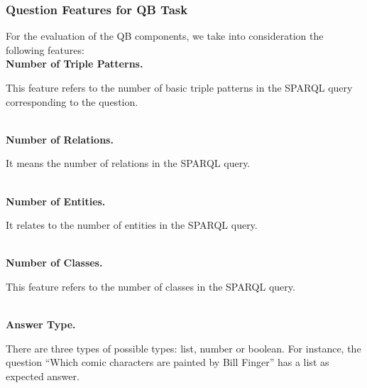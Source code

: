 \documentclass[sigconf,edbt]{acmart-edbt2019}
\newcommand{\qq}[1]{``#1''}
\begin{document}
\subsubsection{Question Features for QB Task}
For the evaluation of the QB components, we take into consideration the following features: 
~\\
{\bf Number of Triple Patterns.} \begin{inparaenum}
This feature refers to the number of basic triple patterns in the SPARQL query corresponding to the question.
\end{inparaenum}
~\\
{\bf Number of Relations.} \begin{inparaenum}
It means the number of relations in the SPARQL query.
\end{inparaenum}
~\\
{\bf Number of Entities.} \begin{inparaenum}
It relates to the number of entities in the SPARQL query.
\end{inparaenum}
~\\
{\bf Number of Classes.} \begin{inparaenum}
This feature refers to the number of classes in the SPARQL query.
\end{inparaenum}
~\\
{\bf Answer Type.} \begin{inparaenum}
There are three types of possible types: list, number or boolean. For instance, the question \qq{Which comic characters are painted by Bill Finger} has a list as expected answer.
\end{inparaenum}
\end{document}
